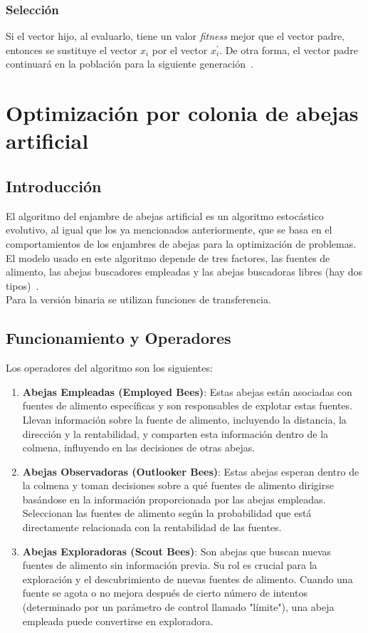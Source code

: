 \subsubsection{Selección}
Si el vector hijo, al evaluarlo, tiene un valor \textit{fitness} mejor que el vector padre, entonces se sustituye el vector $x_i$ por el vector $x^\prime_i$. De otra forma, el vector padre continuará en la población para la siguiente generación~\cite{storn_differential_1997}.

\section{Optimización por colonia de abejas artificial}
\subsection{Introducción}
El algoritmo del enjambre de abejas artificial es un algoritmo estocástico evolutivo, al igual que los ya mencionados anteriormente, que se basa en el comportamientos de los enjambres de abejas para la optimización de problemas. El modelo usado en este algoritmo depende de tres factores, las fuentes de alimento, las abejas buscadores empleadas y las abejas buscadoras libres (hay dos tipos)~\cite{karaboga_idea_nodate}.\\[6pt]
Para la versión binaria se utilizan funciones de transferencia.

\subsection{Funcionamiento y Operadores}
Los operadores del algoritmo son los siguientes:
\begin{enumerate}
    \item \textbf{Abejas Empleadas (Employed Bees)}: Estas abejas están asociadas con fuentes de alimento específicas y son responsables de explotar estas fuentes. Llevan información sobre la fuente de alimento, incluyendo la distancia, la dirección y la rentabilidad, y comparten esta información dentro de la colmena, influyendo en las decisiones de otras abejas.

    \item \textbf{Abejas Observadoras (Outlooker Bees)}: Estas abejas esperan dentro de la colmena y toman decisiones sobre a qué fuentes de alimento dirigirse basándose en la información proporcionada por las abejas empleadas. Seleccionan las fuentes de alimento según la probabilidad que está directamente relacionada con la rentabilidad de las fuentes.

    \item \textbf{Abejas Exploradoras (Scout Bees)}: Son abejas que buscan nuevas fuentes de alimento sin información previa. Su rol es crucial para la exploración y el descubrimiento de nuevas fuentes de alimento. Cuando una fuente se agota o no mejora después de cierto número de intentos (determinado por un parámetro de control llamado "límite"), una abeja empleada puede convertirse en exploradora.
\end{enumerate}

